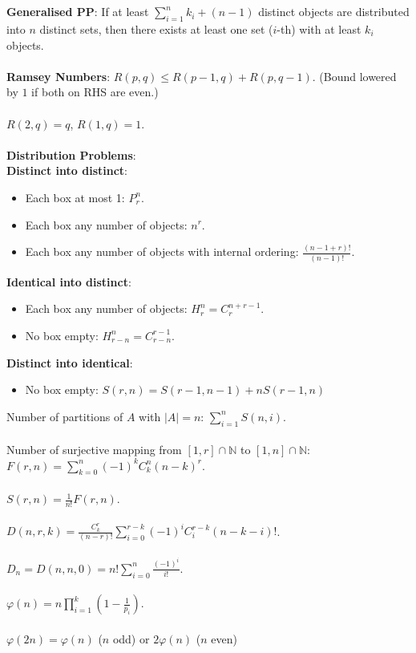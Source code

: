 \documentclass[11pt]{article}
\begin{document}
\begin{multicols*}{3}
        \\\\
        \textbf{Generalised PP}: If at least $\sum_{i = 1}^{n}k_i + (n - 1)$ distinct objects are distributed into $n$ distinct sets, then there exists at least one set ($i$-th) with at least $k_i$ objects.
        \\\\
        \textbf{Ramsey Numbers}: $R(p, q) \leq R(p - 1, q) + R(p, q - 1)$. (Bound lowered by $1$ if both on RHS are even.)
        \\\\
        $R(2, q) = q$, $R(1, q) = 1$.
        \\\\
        \textbf{Distribution Problems}:
        \\
        \textbf{Distinct into distinct}:
        \begin{itemize}
            \item Each box at most 1: $P^n_r$.
            \item Each box any number of objects: $n^r$.
            \item Each box any number of objects with internal ordering: $\frac{(n - 1 + r)!}{(n - 1)!}$.
        \end{itemize}
        \textbf{Identical into distinct}: 
        \begin{itemize}
            \item Each box any number of objects: $H^n_r = C^{n + r - 1}_r$.
            \item No box empty: $H^n_{r - n} = C^{r - 1}_{r - n}$.
        \end{itemize}
        \textbf{Distinct into identical}:
        \begin{itemize}
            \item No box empty: $S(r, n) = S(r - 1, n - 1) + nS(r - 1, n)$
        \end{itemize}
        Number of partitions of $A$ with $\left\lvert A \right\rvert = n$: $\sum_{i = 1}^{n}S(n, i)$.
        \\\\
        Number of surjective mapping from $[1, r] \cap \mathbb{N}$ to $[1, n] \cap \mathbb{N}$: $F(r, n) = \sum_{k = 0}^{n}(-1)^kC^n_k(n - k)^r$.
        \\\\
        $S(r, n) = \frac{1}{n!}F(r, n)$.
        \\\\
        $D(n, r, k) = \frac{C^r_k}{(n - r)!}\sum_{i = 0}^{r - k}(-1)^iC^{r - k}_i(n - k - i)!$.
        \\\\
        $D_n = D(n, n, 0) = n!\sum_{i = 0}^{n}\frac{(-1)^i}{i!}$.
        \\\\
        $\varphi(n) = n\prod_{i = 1}^{k}\left(1 - \frac{1}{p_i}\right)$.
        \\\\
        $\varphi(2n) = \varphi(n)$ ($n$ odd) or $2\varphi(n)$ ($n$ even)


\end{multicols*}
\end{document}
